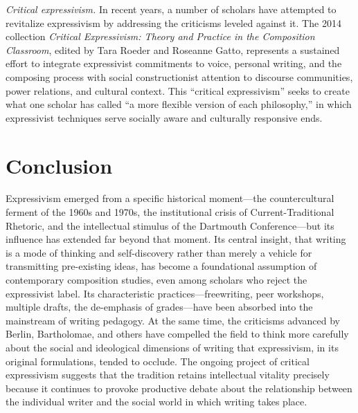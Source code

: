 \documentclass[12pt]{article}
\begin{document}
\textit{Critical expressivism.} In recent years, a number of scholars have attempted to revitalize expressivism by addressing the criticisms leveled against it. The 2014 collection \textit{Critical Expressivism: Theory and Practice in the Composition Classroom}, edited by Tara Roeder and Roseanne Gatto, represents a sustained effort to integrate expressivist commitments to voice, personal writing, and the composing process with social constructionist attention to discourse communities, power relations, and cultural context. This ``critical expressivism'' seeks to create what one scholar has called ``a more flexible version of each philosophy,'' in which expressivist techniques serve socially aware and culturally responsive ends.

\section{Conclusion}

Expressivism emerged from a specific historical moment---the countercultural ferment of the 1960s and 1970s, the institutional crisis of Current-Traditional Rhetoric, and the intellectual stimulus of the Dartmouth Conference---but its influence has extended far beyond that moment. Its central insight, that writing is a mode of thinking and self-discovery rather than merely a vehicle for transmitting pre-existing ideas, has become a foundational assumption of contemporary composition studies, even among scholars who reject the expressivist label. Its characteristic practices---freewriting, peer workshops, multiple drafts, the de-emphasis of grades---have been absorbed into the mainstream of writing pedagogy. At the same time, the criticisms advanced by Berlin, Bartholomae, and others have compelled the field to think more carefully about the social and ideological dimensions of writing that expressivism, in its original formulations, tended to occlude. The ongoing project of critical expressivism suggests that the tradition retains intellectual vitality precisely because it continues to provoke productive debate about the relationship between the individual writer and the social world in which writing takes place.
\end{document}
